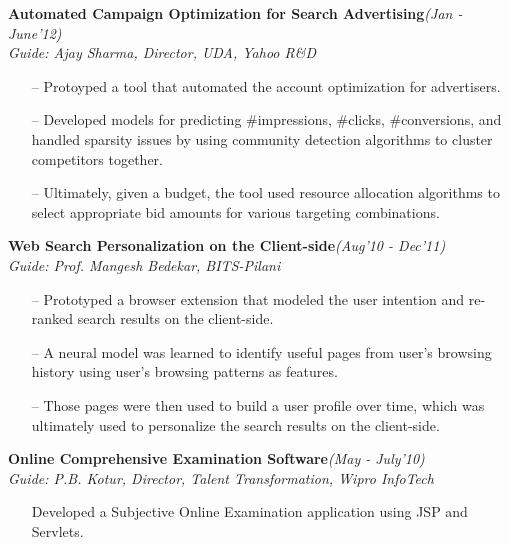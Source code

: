 \documentclass[margin,line]{templates/resume}
\newcommand{\myhref}[3][blue]{\href{#2}{\color{#1}{#3}}}
\newcommand{\compresslist}{%
\setlength{\itemsep}{3pt}%
\setlength{\parskip}{0pt}%
\setlength{\parsep}{0pt}%
}
\begin{document}
\begin{resume}
\vspace{-0.2cm}    
\textsf{\textbf{Automated Campaign Optimization for Search Advertising}}\hfill\textit{\small(Jan - June'12)}
\\ {\textit{Guide: Ajay Sharma, Director, UDA, Yahoo R\&D}} \hfill{\myhref[darkblue]{https://shatu.github.io/\#uda}{Web}}
\normalsize
\vspace{0.05cm}
\begin{itemize}[leftmargin=*]\compresslist
    \item[--]Protoyped a tool that automated the account optimization for advertisers. 
    \item[--]Developed models for predicting \#impressions, \#clicks, \#conversions, and handled sparsity issues by using community detection algorithms to cluster competitors together. 		\item[--]Ultimately, given a budget, the tool used resource allocation algorithms to select appropriate bid amounts for various targeting combinations.
\end{itemize}

\vspace{-0.2cm}    
\textsf{\textbf{Web Search Personalization on the Client-side}}\hfill\textit{\small(Aug'10 - Dec'11)}
\\ {\textit{Guide: Prof. Mangesh Bedekar, BITS-Pilani}} \hfill{\myhref[darkblue]{https://shatu.github.io/\#bits}{Web}}
\normalsize
\vspace{0.05cm}
\begin{itemize}[leftmargin=*]\compresslist
    \item[--]Prototyped a browser extension that modeled the user intention and re-ranked search results on the client-side. 	\item[--]A neural model was learned to identify useful pages from user's browsing history using user's browsing patterns as features. 
    \item[--]Those pages were then used to build a user profile over time, which was ultimately used to personalize the search results on the client-side.
\end{itemize}


\vspace{-0.2cm}    
\textsf{\textbf{Online Comprehensive Examination Software}}\hfill\textit{\small(May - July'10)}
\\ {\textit{Guide: P.B. Kotur, Director, Talent Transformation, Wipro InfoTech}} \hfill{\myhref[darkblue]{https://shatu.github.io/\#wipro}{Web}}
\normalsize
\vspace{0.05cm}
\begin{itemize}[leftmargin=*]\compresslist
    \item[] Developed a Subjective Online Examination application using JSP and Servlets.
\end{itemize}


\end{resume}
\end{document}

